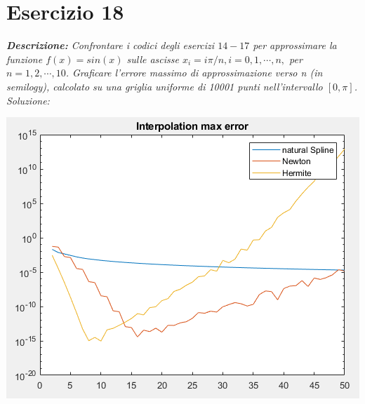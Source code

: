 \section{Esercizio 18}
\textit{\textbf{Descrizione:} Confrontare i codici degli esercizi $14-17$ per approssimare la funzione $f(x) = sin(x)$ sulle ascisse $x_{i} = i \pi/n, i = 0, 1, \cdots , n,$ per $n = 1, 2, \cdots, 10$. Graficare l'errore massimo di approssimazione verso n (in semilogy), calcolato su una griglia uniforme di 10001 punti nell'intervallo $[0, \pi]$.}\newline
\noindent\emph{Soluzione: }\newline

\includegraphics[width=1.3\linewidth]{img/errorInterp.png}